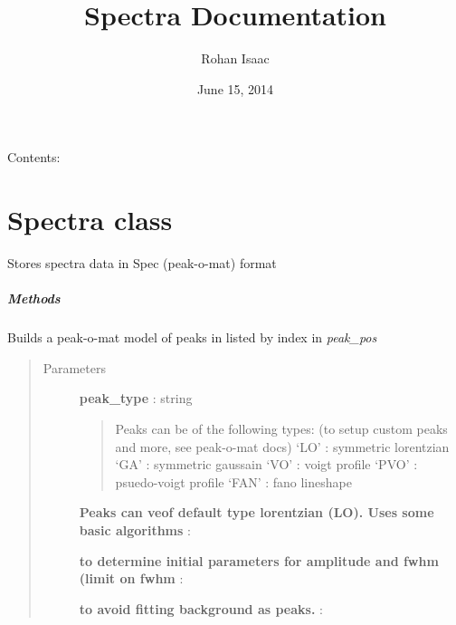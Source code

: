 \documentclass[letterpaper,10pt,english]{sphinxmanual}
\title{Spectra Documentation}
\date{June 15, 2014}
\author{Rohan Isaac}
\begin{document}
\maketitle
\tableofcontents
{}\label{index::doc}


Contents:


\chapter{Spectra class}
\label{spectra:spectra-class}\label{spectra::doc}\label{spectra:welcome-to-spectra-s-documentation}

\begin{fulllineitems}
\label{spectra:spectra.Spectra}
Stores spectra data in Spec (peak-o-mat) format
\paragraph{Methods}

\begin{fulllineitems}
\label{spectra:spectra.Spectra.build_model}
Builds a peak-o-mat model of peaks in listed by index in \emph{peak\_pos}
\begin{quote}\begin{description}
\item[{Parameters}] \leavevmode
\textbf{peak\_type} : string
\begin{quote}

Peaks can be of the following types: 
(to setup custom peaks and more, see peak-o-mat docs)
`LO' : symmetric lorentzian
`GA' : symmetric gaussain
`VO' : voigt profile
`PVO' : psuedo-voigt profile
`FAN' : fano lineshape
\end{quote}

\textbf{Peaks can veof default type lorentzian (LO). Uses some basic algorithms} :

\textbf{to determine initial parameters for amplitude and fwhm (limit on fwhm} :

\textbf{to avoid fitting background as peaks.} :

\end{description}\end{quote}

\end{fulllineitems}


\end{fulllineitems}
\end{document}
